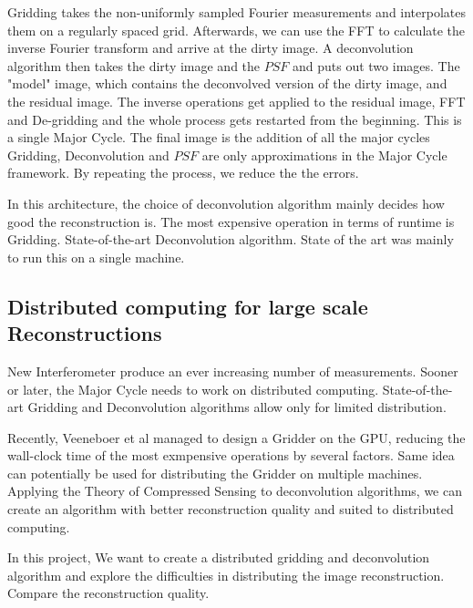 Gridding takes the non-uniformly sampled Fourier measurements and interpolates them on a regularly spaced grid. Afterwards, we can use the FFT to calculate the inverse Fourier transform and arrive at the dirty image. A deconvolution algorithm then takes the dirty image and the $PSF$ and puts out two images. The "model" image, which contains the deconvolved version of the dirty image, and the residual image. The inverse operations get applied to the residual image, FFT and De-gridding and the whole process gets restarted from the beginning. 
This is a single Major Cycle.
The final image is the addition of all the major cycles Gridding, Deconvolution and $PSF$ are only approximations in the Major Cycle framework. By repeating the process, we reduce the the errors.

In this architecture, the choice of deconvolution algorithm mainly decides how good the reconstruction is. 
The most expensive operation in terms of runtime is Gridding. 
State-of-the-art Deconvolution algorithm.
State of the art was mainly to run this on a single machine.

\subsection{Distributed computing for large scale Reconstructions}
New Interferometer produce an ever increasing number of measurements. Sooner or later, the Major Cycle needs to work on distributed computing. State-of-the-art Gridding and Deconvolution algorithms allow only for limited distribution.

Recently, Veeneboer et al\cite{veenboer2017image} managed to design a Gridder on the GPU, reducing the wall-clock time of the most exmpensive operations by several factors. Same idea can potentially be used for distributing the Gridder on multiple machines.
Applying the Theory of Compressed Sensing to deconvolution algorithms, we can create an algorithm with better reconstruction quality and suited to distributed computing.

In this project, We want to create a distributed gridding and deconvolution algorithm and explore the difficulties in distributing the image reconstruction. Compare the reconstruction quality.










